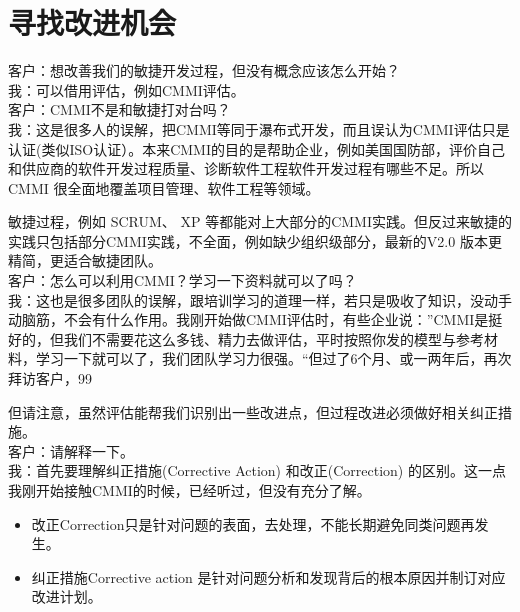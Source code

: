 \chapter{寻找改进机会} %

客户：想改善我们的敏捷开发过程，但没有概念应该怎么开始？\\
我：可以借用评估，例如CMMI评估。\\
客户：CMMI不是和敏捷打对台吗？\\
我：这是很多人的误解，把CMMI等同于瀑布式开发，而且误认为CMMI评估只是认证(类似ISO认证）。本来CMMI的目的是帮助企业，例如美国国防部，评价自己和供应商的软件开发过程质量、诊断软件工程软件开发过程有哪些不足。所以CMMI
很全面地覆盖项目管理、软件工程等领域。

敏捷过程，例如 SCRUM、 XP
等都能对上大部分的CMMI实践。但反过来敏捷的实践只包括部分CMMI实践，不全面，例如缺少组织级部分，最新的V2.0
版本更精简，更适合敏捷团队。\\

客户：怎么可以利用CMMI？学习一下资料就可以了吗？\\
我：这也是很多团队的误解，跟培训学习的道理一样，若只是吸收了知识，没动手动脑筋，不会有什么作用。我刚开始做CMMI评估时，有些企业说：”CMMI是挺好的，但我们不需要花这么多钱、精力去做评估，平时按照你发的模型与参考材料，学习一下就可以了，我们团队学习力很强。“但过了6个月、或一两年后，再次拜访客户，99%

但请注意，虽然评估能帮我们识别出一些改进点，但过程改进必须做好相关纠正措施。\\
客户：请解释一下。\\
我：首先要理解纠正措施(Corrective Action) 和改正(Correction) 的区别。这一点我刚开始接触CMMI的时候，已经听过，但没有充分了解。\\


\begin{itemize}
\tightlist
\item
  改正Correction只是针对问题的表面，去处理，不能长期避免同类问题再发生。
\item
  纠正措施Corrective action
   是针对问题分析和发现背后的根本原因并制订对应改进计划。
\end{itemize}

